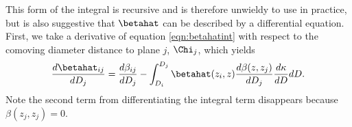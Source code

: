 This form of the integral is recursive and is therefore unwieldy to use in practice, but is also suggestive that $\betahat$ can be described by a differential equation. First, we take a derivative of equation \ref{eqn:betahatint} with respect to the comoving diameter distance to plane $j$, $\Chi_j$, which yields
\begin{equation}
\frac{d\betahat_{i j}}{d D_j} = \frac{d\beta_{i j}}{d D_j} - \int_{D_i}^{D_j} \betahat(z_i, z) \frac{d \beta(z, z_j)}{d D_j} \frac{d \kappa}{d D} d D.
\end{equation}
Note the second term from differentiating the integral term disappears because $\beta(z_j, z_j) = 0$. 
  
  